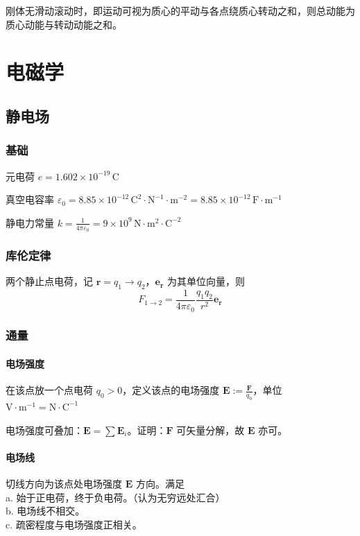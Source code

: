 \documentclass[12pt, a4paper, UTF8, openany]{ctexbook}
\newcommand{\vect}[1]{\mathbf{#1}}
\newcommand{\vecf}{\vect{F}}
\newcommand{\vece}{\vect{E}}
\newcommand{\eps}{\varepsilon}
\newcommand{\conste}{\frac{1}{4 \pi \varepsilon_0}}
\newcommand{\unit}[1]{\mathrm{#1}}
\begin{document}
        刚体无滑动滚动时，即运动可视为质心的平动与各点绕质心转动之和，则总动能为质心动能与转动动能之和。

    \chapter{电磁学}
    \section{静电场}
        \subsection{基础}
        元电荷 $e = 1.602 \times 10^{-19} \,\unit{C}$

        真空电容率 $\eps_0 = 8.85 \times 10^{-12} \,\unit{C^2 \cdot N^{-1} \cdot m^{-2}} = 8.85 \times 10^{-12} \,\unit{F \cdot m^{-1}}$

        静电力常量 $k = \conste = 9 \times 10^{9} \,\unit{N \cdot m^2 \cdot C^{-2}}$

        \subsection{库伦定律}
        两个{\heiti 静止}点电荷，记 $\vect{r} = q_1 \to q_2$，$\vect{e_r}$ 为其单位向量，则
        $$F_{1 \to 2} = \conste \frac{q_1 q_2}{r^2} \vect{e_r}$$

        \subsection{通量}
        \subsubsection{电场强度}
        在该点放一个点电荷 $q_0 > 0$，定义该点的电场强度 $\vece := \frac{\vecf}{q_0}$，单位 $\unit{V \cdot m^{-1}} = \unit{N \cdot C^{-1}}$

        电场强度{\heiti 可叠加}：$\vece = \sum \vece_i$。证明：$\vecf$ 可矢量分解，故 $\vece$ 亦可。

        \subsubsection{电场线}
        切线方向为该点处电场强度 $\vece$ 方向。满足 \\
        a. 始于正电荷，终于负电荷。（认为无穷远处汇合）\\
        b. 电场线不相交。\\
        c. 疏密程度与电场强度正相关。
\end{document}
